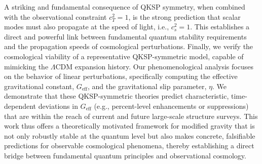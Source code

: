 \documentclass[twocolumn]{aastex631}
\begin{document}
A striking and fundamental consequence of QKSP symmetry, when combined with the observational constraint $c_T^2=1$, is the strong prediction that scalar modes must also propagate at the speed of light, i.e., $c_s^2=1$. This establishes a direct and powerful link between fundamental quantum stability requirements and the propagation speeds of cosmological perturbations. Finally, we verify the cosmological viability of a representative QKSP-symmetric model, capable of mimicking the $\Lambda$CDM expansion history. Our phenomenological analysis focuses on the behavior of linear perturbations, specifically computing the effective gravitational constant, $G_{\text{eff}}$, and the gravitational slip parameter, $\eta$. We demonstrate that these QKSP-symmetric theories predict characteristic, time-dependent deviations in $G_{\text{eff}}$ (e.g., percent-level enhancements or suppressions) that are within the reach of current and future large-scale structure surveys. This work thus offers a theoretically motivated framework for modified gravity that is not only robustly stable at the quantum level but also makes concrete, falsifiable predictions for observable cosmological phenomena, thereby establishing a direct bridge between fundamental quantum principles and observational cosmology.
\end{document}
